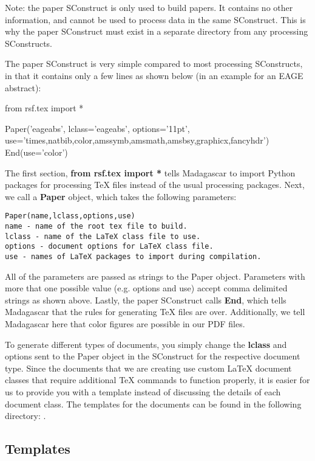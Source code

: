 Note: the paper SConstruct is only used to build papers.  It contains no other information, and cannot be used to process data in the same SConstruct.  This is why the paper SConstruct must exist in a separate directory from any processing SConstructs.

The paper SConstruct is very simple compared to most processing SConstructs, in that it contains only a few lines as shown below (in an example for an EAGE abstract):
\begin{verbatimtab}
from rsf.tex import *

Paper('eageabs',
      lclass='eageabs',
      options='11pt',
      use='times,natbib,color,amssymb,amsmath,amsbsy,graphicx,fancyhdr')
End(use='color')
\end{verbatimtab}

The first section, \textbf{from rsf.tex import *} tells Madagascar to import Python packages for processing TeX files instead of the usual processing packages.  Next, we call a \textbf{Paper} object, which takes the following parameters:
\begin{verbatim}
Paper(name,lclass,options,use)
name - name of the root tex file to build.
lclass - name of the LaTeX class file to use.
options - document options for LaTeX class file.
use - names of LaTeX packages to import during compilation.
\end{verbatim}
All of the parameters are passed as strings to the Paper object.  Parameters with more that one possible value (e.g. options and use) accept comma delimited strings as shown above.  Lastly, the paper SConstruct calls \textbf{End}, which tells Madagascar that the rules for generating TeX files are over.  Additionally, we tell Madagascar here that color figures are possible in our PDF files.

To generate different types of documents, you simply change the \textbf{lclass} and options sent to the Paper object in the SConstruct for the respective document type.  Since the documents that we are creating use custom LaTeX document classes that require additional TeX commands to function properly, it is easier for us to provide you with a template instead of discussing the details of each document class.  The templates for the documents can be found in the following directory: \textbf{\exampledir}.  

\subsection{Templates}

